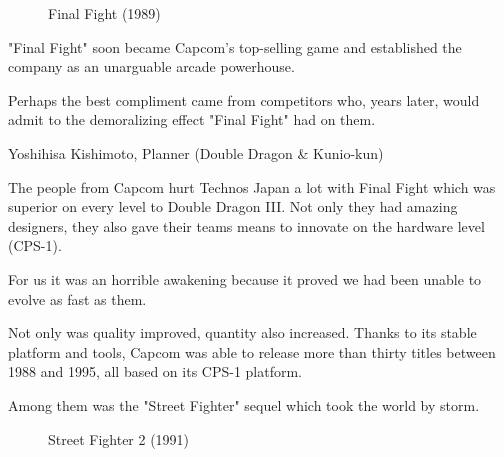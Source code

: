   

\label{nin_ff}
 \begin{figure}[H]
\caption*{Final Fight (1989)}
\end{figure}

"Final Fight" soon became Capcom's top-selling game\cite{birth_of_chunli} and established the company as an unarguable arcade powerhouse.

\pagebreak

Perhaps the best compliment came from competitors who, years later, would admit to the demoralizing effect "Final Fight" had on them.

\begin{q}{Yoshihisa Kishimoto, Planner (Double Dragon \& Kunio-kun)\cite{dd} }
  

  The people from Capcom hurt Technos Japan a lot with Final Fight which was superior on every level to Double Dragon III. Not only they had amazing designers, they also gave their teams means to innovate on the hardware level (CPS-1). 

  For us it was an horrible awakening because it proved we had been unable to evolve as fast as them.
  \end{q}



Not only was quality improved, quantity also increased. Thanks to its stable platform and tools, Capcom was able to release more than thirty titles between 1988 and 1995, all based on its CPS-1 platform. 

Among them was the "Street Fighter" sequel which took the world by storm.

\label{nin_sf2}
\begin{figure}[H]
\caption*{Street Fighter 2 (1991)}
\end{figure}

